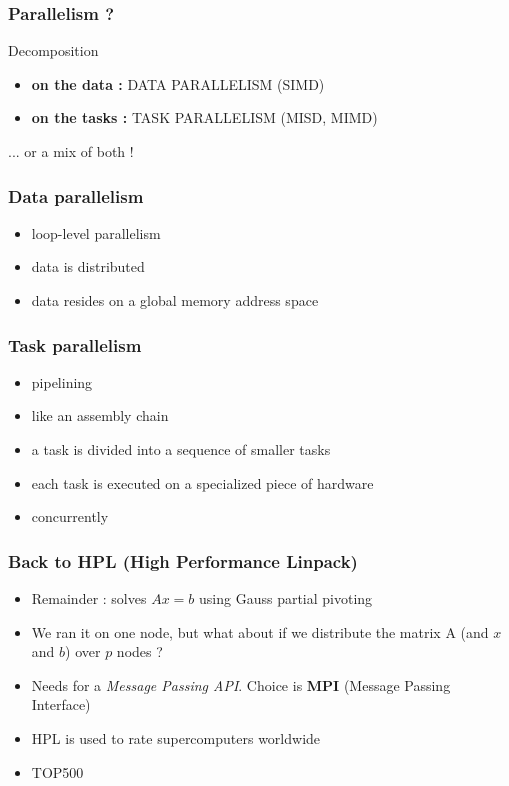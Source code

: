 \begin{frame}[containsverbatim]
\frametitle{Parallelism ?}
Decomposition
\begin{itemize}
	\item{\textbf{on the data :} DATA PARALLELISM (SIMD)}
	\item{\textbf{on the tasks :} TASK PARALLELISM (MISD, MIMD)}
\end{itemize}

... or a mix of both !

\end{frame}

\begin{frame}[containsverbatim]
\frametitle{Data parallelism}
\begin{itemize}
	\item{loop-level parallelism}
	\item{data is distributed}
	\item{data resides on a global memory address space}
\end{itemize}
\end{frame}

\begin{frame}[containsverbatim]
\frametitle{Task parallelism}
\begin{itemize}
	\item{pipelining}
	\item{like an assembly chain}
	\item{a task is divided into a sequence of smaller tasks}
	\item{each task is executed on a specialized piece of hardware}
	\item{concurrently}
\end{itemize}
\end{frame}

\begin{frame}[containsverbatim]
\frametitle{Back to HPL (High Performance Linpack)}
\begin{itemize}
	\item{Remainder : solves $A x = b$ using Gauss partial pivoting}
	\item{We ran it on one node, but what about if we distribute the matrix A (and $x$ and $b$) over $p$ nodes ?}
	\item{Needs for a \textit{Message Passing API}. Choice is \textbf{MPI} (Message Passing Interface)}
	\item{HPL is used to rate supercomputers worldwide}
	\item{TOP500}
\end{itemize}
\end{frame}

